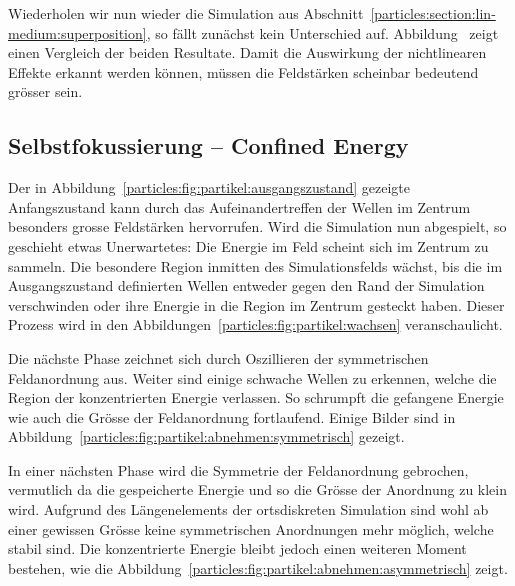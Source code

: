 Wiederholen wir nun wieder die Simulation aus Abschnitt~\ref{particles:section:lin-medium:superposition}, so fällt zunächst kein Unterschied auf.
Abbildung~ zeigt einen Vergleich der beiden Resultate.
Damit die Auswirkung der nichtlinearen Effekte erkannt werden können, müssen die Feldstärken scheinbar bedeutend grösser sein.

\subsection{Selbstfokussierung -- Confined Energy}


Der in Abbildung~\ref{particles:fig:partikel:ausgangszustand} gezeigte Anfangszustand kann durch das Aufeinandertreffen der Wellen im Zentrum besonders grosse Feldstärken hervorrufen.
Wird die Simulation nun abgespielt, so geschieht etwas Unerwartetes: Die Energie im Feld scheint sich im Zentrum zu sammeln.
Die besondere Region inmitten des Simulationsfelds wächst, bis die im Ausgangszustand definierten Wellen entweder gegen den Rand der Simulation verschwinden oder ihre Energie in die Region im Zentrum gesteckt haben.
Dieser Prozess wird in den Abbildungen~\ref{particles:fig:partikel:wachsen} veranschaulicht.


Die nächste Phase zeichnet sich durch Oszillieren der symmetrischen Feldanordnung aus. 
Weiter sind einige schwache Wellen zu erkennen, welche die Region der konzentrierten Energie verlassen.
So schrumpft die gefangene Energie wie auch die Grösse der Feldanordnung fortlaufend.
Einige Bilder sind in Abbildung~\ref{particles:fig:partikel:abnehmen:symmetrisch} gezeigt.


In einer nächsten Phase wird die Symmetrie der Feldanordnung gebrochen, vermutlich da die gespeicherte Energie und so die Grösse der Anordnung zu klein wird.
Aufgrund des Längenelements der ortsdiskreten Simulation sind wohl ab einer gewissen Grösse keine symmetrischen Anordnungen mehr möglich, welche stabil sind.
Die konzentrierte Energie bleibt jedoch einen weiteren Moment bestehen, wie die Abbildung~\ref{particles:fig:partikel:abnehmen:asymmetrisch} zeigt.

